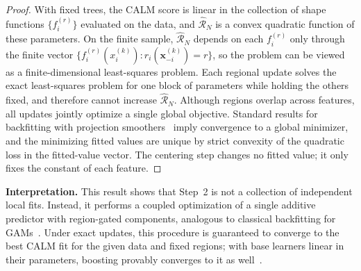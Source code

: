 \begin{proof}
With fixed trees, the CALM score is linear in the collection of shape functions
$\{f_i^{(r)}\}$ evaluated on the data, and $\widehat{\mathcal R}_N$ is a convex
quadratic function of these parameters.
On the finite sample, $\widehat{\mathcal R}_N$ depends on each $f_i^{(r)}$ only through the finite vector
$\{f_i^{(r)}(x_i^{(k)}): r_i(\mathbf{x}_{-i}^{(k)})=r\}$, so the problem can be viewed as a finite-dimensional least-squares problem.
Each regional update solves the exact least-squares problem for one block of
parameters while holding the others fixed, and therefore cannot increase
$\widehat{\mathcal R}_N$.
Although regions overlap across features, all updates jointly optimize a single
global objective.
Standard results for backfitting with projection smoothers~\cite{buja1989linear, ansley1994convergence} imply
convergence to a global minimizer, and the minimizing fitted values are unique by strict convexity of the quadratic loss in the fitted-value vector.
The centering step changes no fitted value; it only fixes the constant of each feature.
\end{proof}

\textbf{Interpretation.}
This result shows that Step~2 is not a collection of independent local fits.
Instead, it performs a coupled optimization of a single additive predictor with
region-gated components, analogous to classical backfitting for GAMs~\cite{buja1989linear}.
Under exact updates, this procedure is guaranteed to converge to the best CALM
fit for the given data and fixed regions; with base learners linear in their parameters, boosting provably converges to it as well~\cite{schulte2025additive}.

